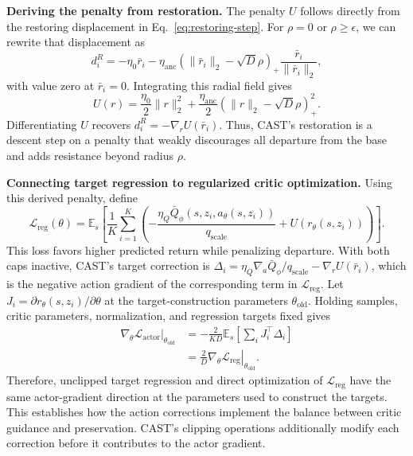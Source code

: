 \textbf{Deriving the penalty from restoration.}
The penalty $U$ follows directly from the restoring displacement in Eq.~\eqref{eq:restoring-step}. For $\rho=0$ or $\rho\geq\epsilon$, we can rewrite that displacement as
\begin{equation}
d_i^R
=-\eta_0\bar r_i
-\eta_{\mathrm{anc}}
\left(\|\bar r_i\|_2-\sqrt D\rho\right)_+
\frac{\bar r_i}{\|\bar r_i\|_2},
\end{equation}
with value zero at $\bar r_i=0$. Integrating this radial field gives
\begin{equation}
U(r)=\frac{\eta_0}{2}\|r\|_2^2+
\frac{\eta_{\mathrm{anc}}}{2}
\left(\|r\|_2-\sqrt D\rho\right)_+^2.
\label{eq:radial-potential}
\end{equation}
Differentiating $U$ recovers $d_i^R=-\nabla_r U(\bar r_i)$. Thus, CAST's restoration is a descent step on a penalty that weakly discourages all departure from the base and adds resistance beyond radius $\rho$.

\textbf{Connecting target regression to regularized critic optimization.}
Using this derived penalty, define
\begin{equation}
\mathcal L_{\mathrm{reg}}(\theta)
=\mathbb E_s\!\left[
\frac{1}{K}\sum_{i=1}^K
\left(
-\frac{\eta_Q\bar Q_\phi(s,z_i,a_\theta(s,z_i))}
{q_{\mathrm{scale}}}
+U(r_\theta(s,z_i))
\right)
\right].
\end{equation}
This loss favors higher predicted return while penalizing departure. With both caps inactive, CAST's target correction is
$\Delta_i=\eta_Q\nabla_a\bar Q_\phi/q_{\mathrm{scale}}-\nabla_r U(\bar r_i)$,
which is the negative action gradient of the corresponding term in $\mathcal L_{\mathrm{reg}}$.
Let $J_i=\partial r_\theta(s,z_i)/\partial\theta$ at the target-construction parameters $\theta_{\mathrm{old}}$. Holding samples, critic parameters, normalization, and regression targets fixed gives
\begin{equation}
\begin{aligned}
\left.\nabla_\theta\mathcal L_{\mathrm{actor}}\right|_{\theta_{\mathrm{old}}}
&=-\frac{2}{KD}\mathbb E_s\!\left[\sum_i J_i^\top\Delta_i\right]\\
&=\frac{2}{D}
\left.\nabla_\theta\mathcal L_{\mathrm{reg}}\right|_{\theta_{\mathrm{old}}}.
\end{aligned}
\label{eq:local-gradient}
\end{equation}
Therefore, unclipped target regression and direct optimization of $\mathcal L_{\mathrm{reg}}$ have the same actor-gradient direction at the parameters used to construct the targets. This establishes how the action corrections implement the balance between critic guidance and preservation. CAST's clipping operations additionally modify each correction before it contributes to the actor gradient.

